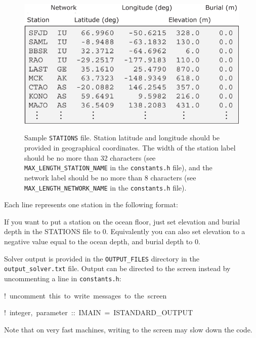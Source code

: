 \documentclass[oneside,english]{book}
\newenvironment{lyxcode}
{\begin{list}{}{
\setlength{\rightmargin}{\leftmargin}
\setlength{\listparindent}{0pt}%
\raggedright
\setlength{\itemsep}{0pt}
\setlength{\parsep}{0pt}
\normalfont\ttfamily}%
 \item[]}
{\end{list}}
\begin{document}
{\small }%
\begin{figure}[H]
\noindent \begin{centering}
{\small \includegraphics{figures/STATIONS_global_explained} }
\par\end{centering}{\small \par}

\caption{Sample \texttt{STATIONS} file. Station latitude and longitude should
be provided in geographical coordinates. The width of the station
label should be no more than 32 characters (see \texttt{MAX\_LENGTH\_STATION\_NAME}
in the \texttt{constants.h} file), and the network label should be
no more than 8 characters (see \texttt{MAX\_LENGTH\_NETWORK\_NAME}
in the \texttt{constants.h} file).}

\end{figure}
{\small \par}

Each line represents one station in the following format:

\begin{lyxcode}
\end{lyxcode}
If you want to put a station on the ocean floor, just set
elevation and burial depth in the STATIONS file to 0.
Equivalently you can also set elevation to a negative value equal
to the ocean depth, and burial depth to 0.

Solver output is provided in the \texttt{OUTPUT\_FILES} directory
in the \texttt{output\_solver.txt} file. Output can be directed to
the screen instead by uncommenting a line in \texttt{constants.h}:

\begin{lyxcode}
!~uncomment~this~to~write~messages~to~the~screen~

!~integer,~parameter~::~IMAIN~=~ISTANDARD\_OUTPUT~
\end{lyxcode}
Note that on very fast machines, writing to the screen may slow down
the code.
\end{document}
